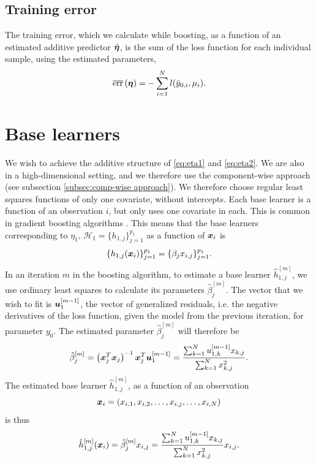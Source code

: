 \subsection{Training error}
The training error, which we calculate while boosting, as a function of an estimated additive predictor $\hat{\boldsymbol{\eta}}$, is the sum of the loss function for each individual sample, using the estimated parameters,
\begin{equation}
\label{eq:training-error-fht}
\overline{\text{err}}\left(\boldsymbol{\eta}\right)=-\sum_{i=1}^N l(\hat{y}_{0,i},\mu_i).
\end{equation}

\section{Base learners}
We wish to achieve the additive structure of \eqref{eq:eta1} and \eqref{eq:eta2}.
We are also in a high-dimensional setting, and we therefore use the component-wise approach (see subsection \ref{subsec:comp-wise approach}).
We therefore choose regular least squares functions of only one covariate, without intercepts.
Each base learner is a function of an observation $i$, but only uses one covariate in each.
This is common in gradient boosting algorithms \citep[see]{mayr14a}.
This means that the base learners corresponding to $\eta_1$, $\mathcal{H}_1=\{h_{1,j}\}_{j=1}^{p_1}$ as a function of $\bm{x}_i$ is
\begin{equation*}
    \{h_{1,j}(\bm{x}_i)\}_{j=1}^{p_1}=\{\beta_jx_{i,j}\}_{j=1}^{p_1}.
\end{equation*}
In an iteration $m$ in the boosting algorithm, to estimate a base learner $\hat{h}_{1,j}^{[m]}$, we use ordinary least squares to calculate its parameters $\hat{\beta}_j^{[m]}$.
The vector that we wish to fit is $\bm{u}_1^{[m-1]}$, the vector of generalized residuals, i.e. the negative derivatives of the loss function, given the model from the previous iteration, for parameter $y_0$.
The estimated parameter $\hat{\beta}_j^{[m]}$ will therefore be
\begin{equation*}
    \hat{\beta}_j^{[m]}=\left(\bm{x}_j^T\bm{x}_j\right)^{-1}\bm{x}_j^T \bm{u}_1^{[m-1]}=\frac{\sum_{k=1}^N u_{1,k}^{[m-1]}x_{k,j}}{\sum_{k=1}^N x_{k,j}^2}.
\end{equation*}
The estimated base learner $\hat{h}_{1,j}^{[m]}$, as a function of an observation
\begin{equation}
    \bm{x}_i=(x_{i,1},x_{i,2},\ldots,x_{i,j},\ldots,x_{i,N})
\end{equation}
is thus
\begin{equation*}
    \hat{h}_{1,j}^{[m]}(\bm{x}_i)=\hat{\beta}_j^{[m]}x_{i,j}=\frac{\sum_{k=1}^N u_{1,k}^{[m-1]}x_{k,j}}{\sum_{k=1}^N x_{k,j}^2}x_{i,j}.
\end{equation*}

